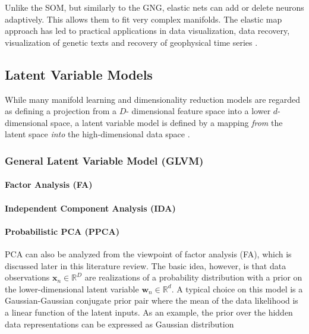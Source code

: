 Unlike the SOM, but similarly to the GNG, elastic nets can add or delete neurons adaptively.  This allows them to fit very complex manifolds.  The elastic map approach has led to practical applications in data visualization, data recovery, visualization of genetic texts and recovery of geophysical time series \citep{Gorban2007ElasticMaps}.


\subsection{Latent Variable Models} \label{sec:LVM}
While many manifold learning and dimensionality reduction models are regarded as defining a projection from a $D$- dimensional feature space into a lower $d$-dimensional space, a latent variable model is defined by a mapping \textit{from} the latent space \textit{into} the high-dimensional data space \citep{Bishop1998GTM}.

\subsubsection{General Latent Variable Model (GLVM)} \label{sec:GLVM}

\paragraph{Factor Analysis (FA)} \label{sec:FA}

\paragraph{Independent Component Analysis (IDA)} \label{sec:IDA}

\paragraph{Probabilistic PCA (PPCA)} \label{sec:PPCA}
PCA can also be analyzed from the viewpoint of factor analysis (FA), which is discussed later in this literature review.  The basic idea, however, is that data observations $\bm{x}_{n} \in \mathbb{R}^{D}$ are realizations of a probability distribution with a prior on the lower-dimensional latent variable $\bm{w}_n \in \mathbb{R}^{d}$.  A typical choice on this model is a Gaussian-Gaussian conjugate prior pair where the mean of the data likelihood is a linear function of the latent inputs.  As an example, the prior over the hidden data representations can be expressed as Gaussian distribution

